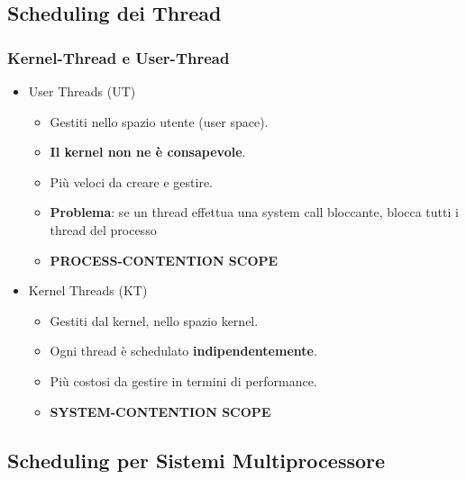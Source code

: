 \documentclass{article}
\begin{document}
\subsection{Scheduling dei Thread}
\subsubsection{Kernel-Thread e User-Thread}
\begin{itemize}
    \item User Threads (UT)
        \begin{itemize}
            \item Gestiti nello spazio utente (user space).
            \item \textbf{Il kernel non ne è consapevole}.
            \item Più veloci da creare e gestire.
            \item \textbf{Problema}: se un thread effettua una system call bloccante, blocca tutti i thread del processo
            \item \textbf{PROCESS-CONTENTION SCOPE}
        \end{itemize}
    \item Kernel Threads (KT)
        \begin{itemize}
            \item Gestiti dal kernel, nello spazio kernel.
            \item Ogni thread è schedulato \textbf{indipendentemente}.
            \item Più costosi da gestire in termini di performance.
            \item \textbf{SYSTEM-CONTENTION SCOPE}
        \end{itemize}
\end{itemize}
\subsection{Scheduling per Sistemi Multiprocessore}
\end{document}
